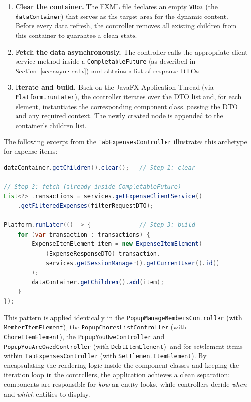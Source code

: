 \begin{enumerate}
    \item \textbf{Clear the container.} The FXML file declares an empty \texttt{VBox} (the \texttt{dataContainer}) that serves as the target area for the dynamic content. Before every data refresh, the controller removes all existing children from this container to guarantee a clean state.
    \item \textbf{Fetch the data asynchronously.} The controller calls the appropriate client service method inside a \texttt{CompletableFuture} (as described in Section~\ref{sec:async-calls}) and obtains a list of response DTOs.
    \item \textbf{Iterate and build.} Back on the JavaFX Application Thread (via \texttt{Platform.runLater}), the controller iterates over the DTO list and, for each element, instantiates the corresponding component class, passing the DTO and any required context. The newly created node is appended to the container's children list.
\end{enumerate}

The following excerpt from the \texttt{TabExpensesController} illustrates this archetype for expense items:

\begin{lstlisting}[language=Java, caption=Dynamic UI loading archetype (from TabExpensesController)]
dataContainer.getChildren().clear();   // Step 1: clear

// Step 2: fetch (already inside CompletableFuture)
List<?> transactions = services.getExpenseClientService()
    .getFilteredExpenses(filterRequestDTO);

Platform.runLater(() -> {              // Step 3: build
    for (var transaction : transactions) {
        ExpenseItemElement item = new ExpenseItemElement(
            (ExpenseResponseDTO) transaction,
            services.getSessionManager().getCurrentUser().id()
        );
        dataContainer.getChildren().add(item);
    }
});
\end{lstlisting}

This pattern is applied identically in the \texttt{PopupManageMembersController} (with \texttt{MemberItemElement}), the \texttt{PopupChoresListController} (with \texttt{ChoreItemElement}), the \texttt{PopupYouOweController} and \texttt{PopupYouAreOwedController} (with \texttt{DebtItemElement}), and for settlement items within \texttt{TabExpensesController} (with \texttt{SettlementItemElement}). By encapsulating the rendering logic inside the component classes and keeping the iteration loop in the controllers, the application achieves a clean separation: components are responsible for \textit{how} an entity looks, while controllers decide \textit{when} and \textit{which} entities to display.

